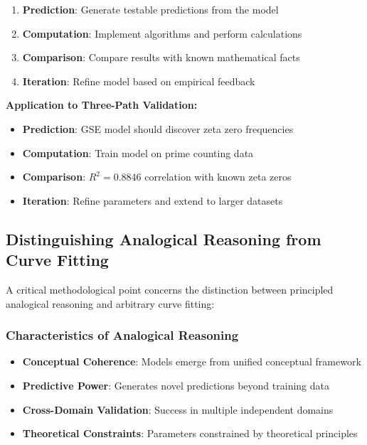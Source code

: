 \begin{process}
\begin{enumerate}
\item \textbf{Prediction}: Generate testable predictions from the model
\item \textbf{Computation}: Implement algorithms and perform calculations
\item \textbf{Comparison}: Compare results with known mathematical facts
\item \textbf{Iteration}: Refine model based on empirical feedback
\end{enumerate}
\end{process}

\textbf{Application to Three-Path Validation:}
\begin{itemize}
\item \textbf{Prediction}: GSE model should discover zeta zero frequencies
\item \textbf{Computation}: Train model on prime counting data
\item \textbf{Comparison}: $R^2 = 0.8846$ correlation with known zeta zeros
\item \textbf{Iteration}: Refine parameters and extend to larger datasets
\end{itemize}

\subsection{Distinguishing Analogical Reasoning from Curve Fitting}

A critical methodological point concerns the distinction between principled analogical reasoning and arbitrary curve fitting:

\subsubsection{Characteristics of Analogical Reasoning}

\begin{itemize}
\item \textbf{Conceptual Coherence}: Models emerge from unified conceptual framework
\item \textbf{Predictive Power}: Generates novel predictions beyond training data
\item \textbf{Cross-Domain Validation}: Success in multiple independent domains
\item \textbf{Theoretical Constraints}: Parameters constrained by theoretical principles
\end{itemize}

